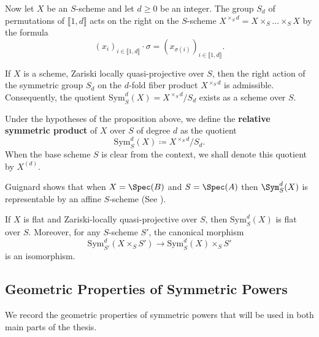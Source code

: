 Now let $X$ be an $S$-scheme and let $d \geq 0$ be an integer. The group ${S}_d$ of permutations of $\llbracket 1, d \rrbracket$ acts on the right on the $S$-scheme $X^{\times_S d} = X \times_S \dots \times_S X$ by the formula
\[
(x_i)_{i \in \llbracket 1, d \rrbracket} \cdot \sigma = (x_{\sigma(i)})_{i \in \llbracket 1, d \rrbracket}.
\]

\begin{prop}
    If $X$ is a scheme, Zariski locally quasi-projective over $S$, then the right action of the symmetric group $S_d$ on the $d$-fold fiber product 
    $X^{\times_S d}$ is admissible. 
    Consequently, the quotient $\mathrm{Sym}_S^d(X) = X^{\times_S d}/S_d$ exists as a scheme over $S$.
\end{prop}

\begin{definition}
    Under the hypotheses of the proposition above, we define the \textbf{relative symmetric product} of $X$ over $S$ 
    of degree $d$ as the quotient
    $$\mathrm{Sym}_S^d(X) \coloneqq X^{\times_S d}/S_d.$$
    When the base scheme $S$ is clear from the context, we shall denote this quotient by 
    $X^{(d)}$.
\end{definition}

Guignard shows that when $X=\Spec(B)$ and $S=\Spec(A)$ then $\Sym_{S}^d(X)$ is representable by an affine $S$-scheme (See \cite[Remark~2.28]{Guignard2018}).

\begin{prop}\label{prop:symmetric_power_flat_base_change}
If $X$ is flat and Zariski-locally quasi-projective over $S$, then $\text{Sym}_S^d(X)$ is flat over $S$. Moreover, for any $S$-scheme $S'$, the canonical morphism
\[
\text{Sym}_{S'}^d(X \times_S S') \to \text{Sym}_S^d(X) \times_S S'
\]
is an isomorphism.
\end{prop}

\subsection*{Geometric Properties of Symmetric Powers}

We record the geometric properties of symmetric powers that will be used in
both main parts of the thesis.

